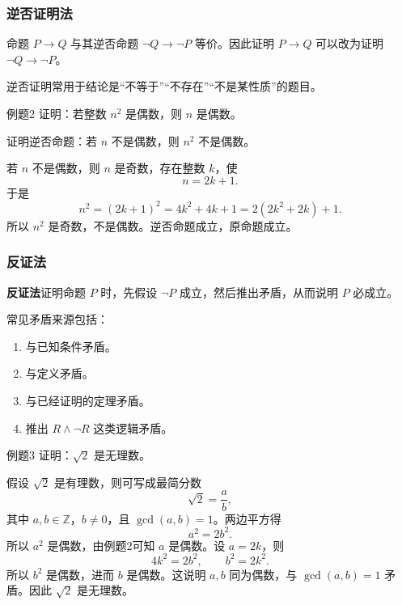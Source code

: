 \subsubsection{逆否证明法}

命题 \(P\to Q\) 与其逆否命题 \(\neg Q\to\neg P\) 等价。因此证明 \(P\to Q\) 可以改为证明 \(\neg Q\to\neg P\)。

逆否证明常用于结论是“不等于”“不存在”“不是某性质”的题目。

\begin{question}{例题2}
	证明：若整数 \(n^2\) 是偶数，则 \(n\) 是偶数。
	
	\begin{solution}
	证明逆否命题：若 \(n\) 不是偶数，则 \(n^2\) 不是偶数。
	
	若 \(n\) 不是偶数，则 \(n\) 是奇数，存在整数 \(k\)，使
	\[
	n=2k+1.
	\]
	于是
	\[
	n^2=(2k+1)^2=4k^2+4k+1=2(2k^2+2k)+1.
	\]
	所以 \(n^2\) 是奇数，不是偶数。逆否命题成立，原命题成立。
	\end{solution}
\end{question}

\subsubsection{反证法}

\textbf{反证法}证明命题 \(P\) 时，先假设 \(\neg P\) 成立，然后推出矛盾，从而说明 \(P\) 必成立。

常见矛盾来源包括：
\begin{enumerate}
	\item 与已知条件矛盾。
	\item 与定义矛盾。
	\item 与已经证明的定理矛盾。
	\item 推出 \(R\land\neg R\) 这类逻辑矛盾。
\end{enumerate}

\begin{question}{例题3}
	证明：\(\sqrt2\) 是无理数。
	
	\begin{solution}
	假设 \(\sqrt2\) 是有理数，则可写成最简分数
	\[
	\sqrt2=\frac ab,
	\]
	其中 \(a,b\in\mathbb Z\)，\(b\ne0\)，且 \(\gcd(a,b)=1\)。两边平方得
	\[
	a^2=2b^2.
	\]
	所以 \(a^2\) 是偶数，由例题2可知 \(a\) 是偶数。设 \(a=2k\)，则
	\[
	4k^2=2b^2,\qquad b^2=2k^2.
	\]
	所以 \(b^2\) 是偶数，进而 \(b\) 是偶数。这说明 \(a,b\) 同为偶数，与 \(\gcd(a,b)=1\) 矛盾。因此 \(\sqrt2\) 是无理数。
	\end{solution}
\end{question}

